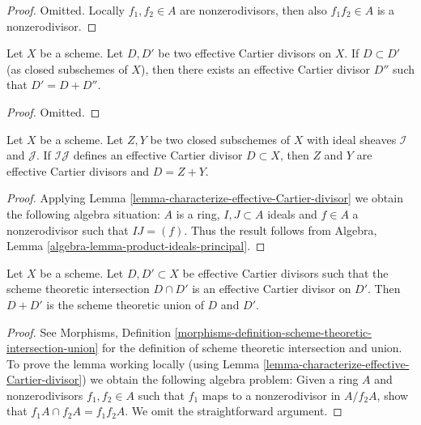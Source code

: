 \begin{proof}
Omitted. Locally $f_1, f_2 \in A$ are nonzerodivisors, then also
$f_1f_2 \in A$ is a nonzerodivisor.
\end{proof}

\begin{lemma}
\label{lemma-difference-effective-Cartier-divisors}
Let $X$ be a scheme.
Let $D, D'$ be two effective Cartier divisors on $X$.
If $D \subset D'$ (as closed subschemes of $X$), then
there exists an effective Cartier divisor $D''$ such
that $D' = D + D''$.
\end{lemma}

\begin{proof}
Omitted.
\end{proof}

\begin{lemma}
\label{lemma-sum-closed-subschemes-effective-Cartier}
Let $X$ be a scheme. Let $Z, Y$ be two closed subschemes of $X$
with ideal sheaves $\mathcal{I}$ and $\mathcal{J}$. If $\mathcal{I}\mathcal{J}$
defines an effective Cartier divisor $D \subset X$, then $Z$ and $Y$
are effective Cartier divisors and $D = Z + Y$.
\end{lemma}

\begin{proof}
Applying Lemma \ref{lemma-characterize-effective-Cartier-divisor} we obtain
the following algebra situation: $A$ is a ring, $I, J \subset A$
ideals and $f \in A$ a nonzerodivisor such that $IJ = (f)$.
Thus the result follows from
Algebra, Lemma \ref{algebra-lemma-product-ideals-principal}.
\end{proof}

\begin{lemma}
\label{lemma-sum-effective-Cartier-divisors-union}
Let $X$ be a scheme. Let $D, D' \subset X$ be effective Cartier divisors
such that the scheme theoretic intersection $D \cap D'$ is an effective
Cartier divisor on $D'$. Then $D + D'$ is the scheme theoretic
union of $D$ and $D'$.
\end{lemma}

\begin{proof}
See Morphisms, Definition
\ref{morphisms-definition-scheme-theoretic-intersection-union}
for the definition of scheme theoretic intersection and union.
To prove the lemma working locally
(using Lemma \ref{lemma-characterize-effective-Cartier-divisor})
we obtain the following algebra problem: Given a ring $A$
and nonzerodivisors $f_1, f_2 \in A$ such that $f_1$ maps
to a nonzerodivisor in $A/f_2A$, show that $f_1A \cap f_2A = f_1f_2A$.
We omit the straightforward argument.
\end{proof}

